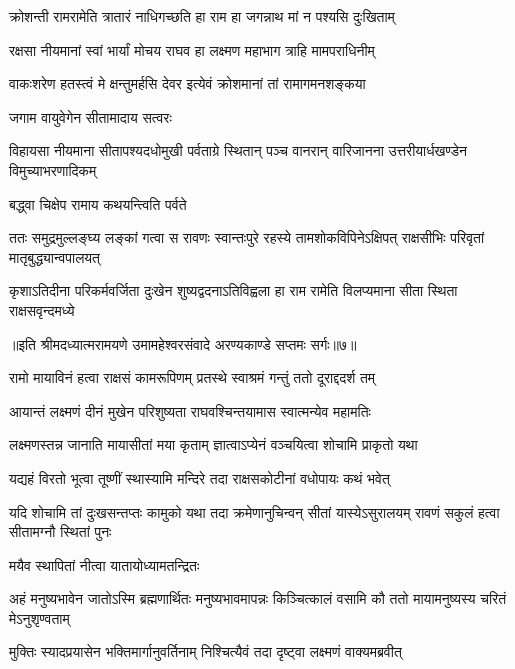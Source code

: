 \twolineshloka
{क्रोशन्ती रामरामेति त्रातारं नाधिगच्छति}
{हा राम हा जगन्नाथ मां न पश्यसि दुःखिताम्} %

\twolineshloka
{रक्षसा नीयमानां स्वां भार्यां मोचय राघव}
{हा लक्ष्मण महाभाग त्राहि मामपराधिनीम्} %

\twolineshloka
{वाकःशरेण हतस्त्वं मे क्षन्तुमर्हसि देवर}
{इत्येवं क्रोशमानां तां रामागमनशङ्कया} %

\onelineshloka
{जगाम वायुवेगेन सीतामादाय सत्वरः} %


\threelineshloka
{विहायसा नीयमाना सीतापश्यदधोमुखी}
{पर्वताग्रे स्थितान् पञ्च वानरान् वारिजानना}
{उत्तरीयार्धखण्डेन विमुच्याभरणादिकम्} %

\onelineshloka
{बद्ध्वा चिक्षेप रामाय कथयन्त्विति पर्वते} %


\threelineshloka
{ततः समुद्रमुल्लङ्घ्य लङ्कां गत्वा स रावणः}
{स्वान्तःपुरे रहस्ये तामशोकविपिनेऽक्षिपत्}
{राक्षसीभिः परिवृतां मातृबुद्ध्यान्वपालयत्} %

\fourlineindentedshloka
{कृशाऽतिदीना परिकर्मवर्जिता}
{दुःखेन शुष्यद्वदनाऽतिविह्वला}
{हा राम रामेति विलप्यमाना}
{सीता स्थिता राक्षसवृन्दमध्ये} %

{॥इति श्रीमदध्यात्मरामयणे उमामहेश्वरसंवादे
अरण्यकाण्डे सप्तमः सर्गः॥७॥
}





\twolineshloka
{रामो मायाविनं हत्वा राक्षसं कामरूपिणम्}
{प्रतस्थे स्वाश्रमं गन्तुं ततो दूराद्ददर्श तम्} %

\twolineshloka
{आयान्तं लक्ष्मणं दीनं मुखेन परिशुष्यता}
{राघवश्चिन्तयामास स्वात्मन्येव महामतिः} %

\twolineshloka
{लक्ष्मणस्तन्न जानाति मायासीतां मया कृताम्}
{ज्ञात्वाऽप्येनं वञ्चयित्वा शोचामि प्राकृतो यथा} %

\twolineshloka
{यद्यहं विरतो भूत्वा तूष्णीं स्थास्यामि मन्दिरे}
{तदा राक्षसकोटीनां वधोपायः कथं भवेत्} %

\threelineshloka
{यदि शोचामि तां दुःखसन्तप्तः कामुको यथा}
{तदा क्रमेणानुचिन्वन् सीतां यास्येऽसुरालयम्}
{रावणं सकुलं हत्वा सीतामग्नौ स्थितां पुनः} %

\onelineshloka
{मयैव स्थापितां नीत्वा यातायोध्यामतन्द्रितः} %


\threelineshloka
{अहं मनुष्यभावेन जातोऽस्मि ब्रह्मणार्थितः}
{मनुष्यभावमापन्नः किञ्चित्कालं वसामि कौ}
{ततो मायामनुष्यस्य चरितं मेऽनुशृण्वताम्} %

\twolineshloka
{मुक्तिः स्यादप्रयासेन भक्तिमार्गानुवर्तिनाम्}
{निश्चित्यैवं तदा दृष्ट्वा लक्ष्मणं वाक्यमब्रवीत्} %

